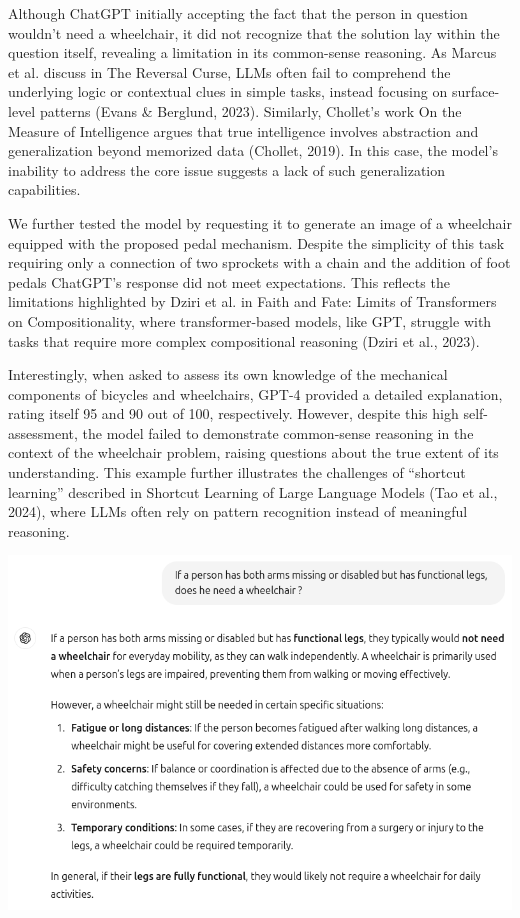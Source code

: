 \documentclass[11pt]{scrartcl}
\begin{document}
Although ChatGPT initially accepting the fact that the person in question wouldn’t need a wheelchair, it did not recognize that the solution lay within the question itself, revealing a limitation in its common-sense reasoning. As Marcus et al. discuss in The Reversal Curse\cite{ref1}, LLMs often fail to comprehend the underlying logic or contextual clues in simple tasks, instead focusing on surface-level patterns (Evans \& Berglund, 2023)\cite{ref1}. Similarly, Chollet’s work On the Measure of Intelligence argues that true intelligence involves abstraction and generalization beyond memorized data (Chollet, 2019)\cite{ref3}. In this case, the model’s inability to address the core issue suggests a lack of such generalization capabilities.

We further tested the model by requesting it to generate an image of a wheelchair equipped with the proposed pedal mechanism. Despite the simplicity of this task requiring only a connection of two sprockets with a chain and the addition of foot pedals ChatGPT’s response did not meet expectations. This reflects the limitations highlighted by Dziri et al. in Faith and Fate: Limits of Transformers on Compositionality, where transformer-based models, like GPT, struggle with tasks that require more complex compositional reasoning (Dziri et al., 2023)\cite{ref4}.

Interestingly, when asked to assess its own knowledge of the mechanical components of bicycles and wheelchairs, GPT-4 provided a detailed explanation, rating itself 95 and 90 out of 100, respectively. However, despite this high self-assessment, the model failed to demonstrate common-sense reasoning in the context of the wheelchair problem, raising questions about the true extent of its understanding. This example further illustrates the challenges of “shortcut learning” described in Shortcut Learning of Large Language Models (Tao et al., 2024)\cite{ref5}, where LLMs often rely on pattern recognition instead of meaningful reasoning.

\begin{center}
\includegraphics[scale=0.39]{wheelchair_problem_0.png}
\end{center}
\end{document}

